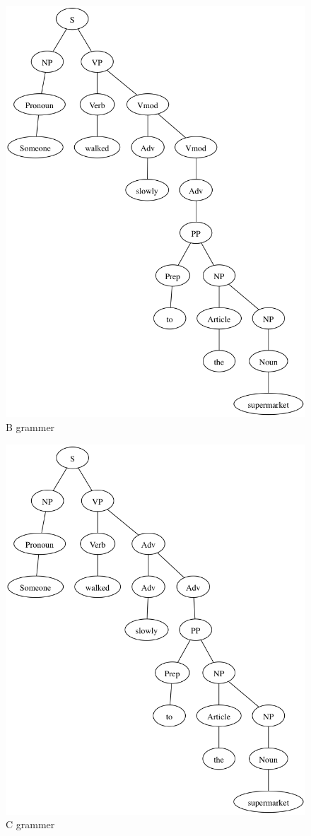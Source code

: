 \documentclass[paper=a4, fontsize=11pt]{scrartcl} %
\begin{document}
\begin{figure}[hp]
  \centering
  \includegraphics[width=.7\textwidth]{4-8.gv.2.png}
  \caption{B grammer}
\end{figure}

\begin{figure}[hp]
  \centering
  \includegraphics[width=.7\textwidth]{4-8.gv.3.png}
  \caption{C grammer}
\end{figure}
\end{document}

